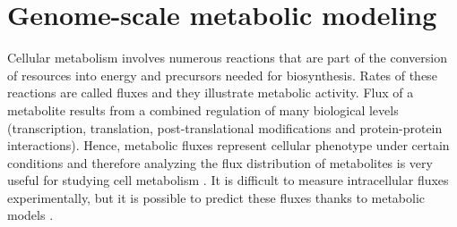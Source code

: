 







\section{Genome-scale metabolic modeling} %

Cellular metabolism involves numerous reactions that are part of the conversion of resources into energy and precursors needed for 
biosynthesis. Rates of these reactions are called fluxes and they illustrate metabolic activity.
Flux of a metabolite results from a combined regulation of many biological levels (transcription, translation, 
post-translational modifications and protein-protein interactions). \cite{Nidelet2016} Hence, metabolic fluxes represent cellular phenotype
under certain conditions and therefore analyzing the flux distribution of metabolites is very useful for studying cell metabolism \cite{Nielsen2003}.
It is difficult to measure intracellular fluxes experimentally, but it is possible to predict these fluxes thanks to metabolic models \cite{Nidelet2016}.

